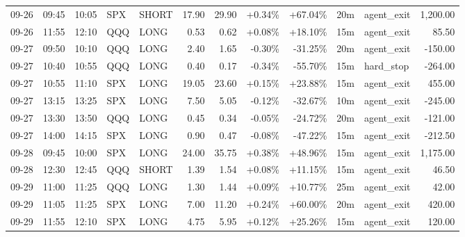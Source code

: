 \documentclass[11pt,a4paper]{article}
\begin{document}
\begin{center}
\begin{longtable}{>{\color{txtmain}}l l l l l r r r r r >{\color{txtmain}}l r}
09-26 & 09:45 & 10:05 & SPX & SHORT & 17.90 & 29.90 & \textcolor{wingreen}{+0.34\%} & \textcolor{wingreen}{+67.04\%} & 20m & agent\_exit & \textcolor{wingreen}{1,200.00} \\
09-26 & 11:55 & 12:10 & QQQ & LONG & 0.53 & 0.62 & \textcolor{wingreen}{+0.08\%} & \textcolor{wingreen}{+18.10\%} & 15m & agent\_exit & \textcolor{wingreen}{85.50} \\
09-27 & 09:50 & 10:10 & QQQ & LONG & 2.40 & 1.65 & \textcolor{lossred}{-0.30\%} & \textcolor{lossred}{-31.25\%} & 20m & agent\_exit & \textcolor{lossred}{-150.00} \\
09-27 & 10:40 & 10:55 & QQQ & LONG & 0.40 & 0.17 & \textcolor{lossred}{-0.34\%} & \textcolor{lossred}{-55.70\%} & 15m & hard\_stop & \textcolor{lossred}{-264.00} \\
09-27 & 10:55 & 11:10 & SPX & LONG & 19.05 & 23.60 & \textcolor{wingreen}{+0.15\%} & \textcolor{wingreen}{+23.88\%} & 15m & agent\_exit & \textcolor{wingreen}{455.00} \\
09-27 & 13:15 & 13:25 & SPX & LONG & 7.50 & 5.05 & \textcolor{lossred}{-0.12\%} & \textcolor{lossred}{-32.67\%} & 10m & agent\_exit & \textcolor{lossred}{-245.00} \\
09-27 & 13:30 & 13:50 & QQQ & LONG & 0.45 & 0.34 & \textcolor{lossred}{-0.05\%} & \textcolor{lossred}{-24.72\%} & 20m & agent\_exit & \textcolor{lossred}{-121.00} \\
09-27 & 14:00 & 14:15 & SPX & LONG & 0.90 & 0.47 & \textcolor{lossred}{-0.08\%} & \textcolor{lossred}{-47.22\%} & 15m & agent\_exit & \textcolor{lossred}{-212.50} \\
09-28 & 09:45 & 10:00 & SPX & LONG & 24.00 & 35.75 & \textcolor{wingreen}{+0.38\%} & \textcolor{wingreen}{+48.96\%} & 15m & agent\_exit & \textcolor{wingreen}{1,175.00} \\
09-28 & 12:30 & 12:45 & QQQ & SHORT & 1.39 & 1.54 & \textcolor{wingreen}{+0.08\%} & \textcolor{wingreen}{+11.15\%} & 15m & agent\_exit & \textcolor{wingreen}{46.50} \\
09-29 & 11:00 & 11:25 & QQQ & LONG & 1.30 & 1.44 & \textcolor{wingreen}{+0.09\%} & \textcolor{wingreen}{+10.77\%} & 25m & agent\_exit & \textcolor{wingreen}{42.00} \\
09-29 & 11:05 & 11:25 & SPX & LONG & 7.00 & 11.20 & \textcolor{wingreen}{+0.24\%} & \textcolor{wingreen}{+60.00\%} & 20m & agent\_exit & \textcolor{wingreen}{420.00} \\
09-29 & 11:55 & 12:10 & SPX & LONG & 4.75 & 5.95 & \textcolor{wingreen}{+0.12\%} & \textcolor{wingreen}{+25.26\%} & 15m & agent\_exit & \textcolor{wingreen}{120.00} \\

\end{longtable}
\end{center}
\end{document}
